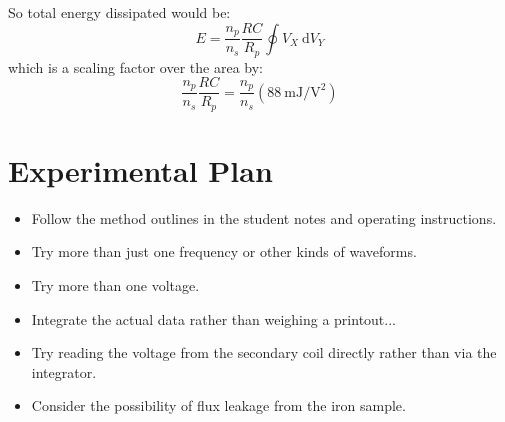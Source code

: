 \documentclass[a4paper]{scrartcl}
\begin{document}
So total energy dissipated would be:
\[E = \frac{n_p}{n_s}\frac{R C}{R_p} \oint V_X \:\mathrm{d}V_Y\]
which is a scaling factor over the area by:
\[\frac{n_p}{n_s}\frac{R C}{R_p} = \frac{n_p}{n_s} (\SI{88}{\milli\joule\per\volt\squared})\]

\section{Experimental Plan}
\begin{itemize}
    \item Follow the method outlines in the student notes and operating instructions.
    \item Try more than just one frequency or other kinds of waveforms.
    \item Try more than one voltage.
    \item Integrate the actual data rather than weighing a printout...
    \item Try reading the voltage from the secondary coil directly rather than via the integrator.
    \item Consider the possibility of flux leakage from the iron sample.
\end{itemize}
\end{document}
